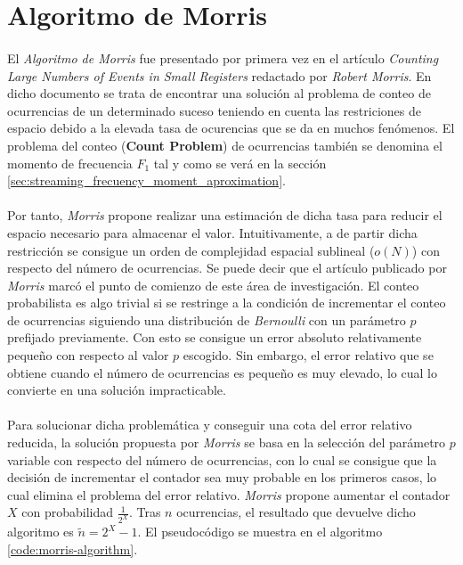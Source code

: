 \documentclass{subfiles}
\begin{document}
    \section{Algoritmo de Morris}
    \label{sec:streaming_morris_algorithm}

      \paragraph{}
      El \emph{Algoritmo de Morris} fue presentado por primera vez en el artículo \emph{Counting Large Numbers of Events in Small Registers} \cite{morris1978counting} redactado por \emph{Robert Morris}. En dicho documento se trata de encontrar una solución al problema de conteo de ocurrencias de un determinado suceso teniendo en cuenta las restriciones de espacio debido a la elevada tasa de ocurencias que se da en muchos fenómenos. El problema del conteo (\textbf{Count Problem}) de ocurrencias también se denomina el momento de frecuencia $F_1$ tal y como se verá en la sección \ref{sec:streaming_frecuency_moment_aproximation}.

      \paragraph{}
      Por tanto, \emph{Morris} propone realizar una estimación de dicha tasa para reducir el espacio necesario para almacenar el valor. Intuitivamente, a de partir dicha restricción se consigue un orden de complejidad espacial sublineal ($o(N)$) con respecto del número de ocurrencias. Se puede decir que el artículo publicado por \emph{Morris} marcó el punto de comienzo de este área de investigación. El conteo probabilista es algo trivial si se restringe a la condición de incrementar el conteo de ocurrencias siguiendo una distribución de \emph{Bernoulli} con un parámetro $p$ prefijado previamente. Con esto se consigue un error absoluto relativamente pequeño con respecto al valor $p$ escogido. Sin embargo, el error relativo que se obtiene cuando el número de ocurrencias es pequeño es muy elevado, lo cual lo convierte en una solución impracticable.

      \paragraph{}
      Para solucionar dicha problemática y conseguir una cota del error relativo reducida, la solución propuesta por \emph{Morris} se basa en la selección del parámetro $p$ variable con respecto del número de ocurrencias, con lo cual se consigue que la decisión de incrementar el contador sea muy probable en los primeros casos, lo cual elimina el problema del error relativo. \emph{Morris} propone aumentar el contador $X$ con probabilidad $\frac{1}{2^X}$. Tras $n$ ocurrencias, el resultado que devuelve dicho algoritmo es $\widetilde{n} = 2^X -1$. El pseudocódigo se muestra en el algoritmo \ref{code:morris-algorithm}.
\end{document}
